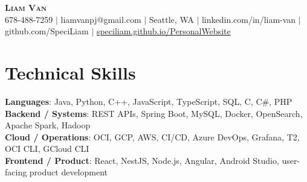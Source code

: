\documentclass[letterpaper,11pt]{article}
\begin{document}

%
\begin{center}
    \textbf{\Huge \scshape Liam Van} \\ \vspace{1pt}
    \small 678-488-7259 $|$ \small {liamvanpj@gmail.com} $|$ Seattle, WA
 {{$|$ linkedin.com/in/liam-van} {$|$ github.com/SpeciLiam} {$|$ \href{https://speciliam.github.io/PersonalWebsite}{speciliam.github.io/PersonalWebsite}}}

\end{center}

\section{Technical Skills}
 \begin{itemize}[leftmargin=0.15in, label={}]
    \small{\item{
     \textbf{Languages}{: Java, Python, C++, JavaScript, TypeScript, SQL, C, C\#, PHP} \\
     \textbf{Backend / Systems}{: REST APIs, Spring Boot, MySQL, Docker, OpenSearch, Apache Spark, Hadoop} \\
     \textbf{Cloud / Operations}{: OCI, GCP, AWS, CI/CD, Azure DevOps, Grafana, T2, OCI CLI, GCloud CLI} \\
     \textbf{Frontend / Product}{: React, NestJS, Node.js, Angular, Android Studio, user-facing product development} \\
    }}
 \end{itemize}
%
\end{document}
